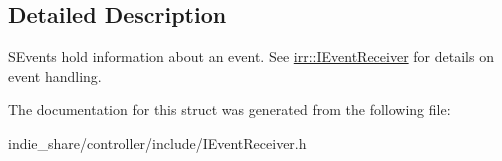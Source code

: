 \subsection{Detailed Description}
S\+Events hold information about an event. See \hyperlink{classirr_1_1IEventReceiver}{irr\+::\+I\+Event\+Receiver} for details on event handling. 

The documentation for this struct was generated from the following file\+:\begin{DoxyCompactItemize}
\item 
indie\+\_\+share/controller/include/I\+Event\+Receiver.\+h\end{DoxyCompactItemize}
